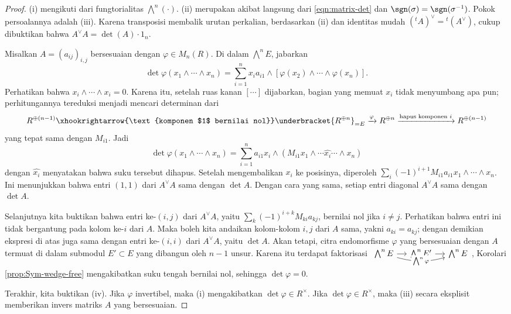 \begin{proof}
	(i) mengikuti dari fungtorialitas $\bigwedge^n(\cdot)$. (ii) merupakan akibat langsung dari \eqref{eqn:matrix-det} dan $\sgn(\sigma) = \sgn(\sigma^{-1})$. Pokok persoalannya adalah (iii). Karena transposisi membalik urutan perkalian, berdasarkan (ii) dan identitas mudah $({}^t A)^\vee = {}^t(A^\vee)$, cukup dibuktikan bahwa $A^\vee A = \det(A) \cdot 1_n$.

	Misalkan $A = (a_{ij})_{i,j}$ bersesuaian dengan $\varphi \in M_n(R)$. Di dalam $\bigwedge^n E$, jabarkan
	\[ \det\varphi(x_1 \wedge \cdots \wedge x_n) = \sum_{i=1}^n x_i a_{i1} \wedge \left[ \varphi(x_2) \wedge \cdots \wedge \varphi(x_n) \right]. \]
	Perhatikan bahwa $x_i \wedge \cdots \wedge x_i = 0$. Karena itu, setelah ruas kanan $[\cdots]$ dijabarkan, bagian yang memuat $x_i$ tidak menyumbang apa pun; perhitungannya tereduksi menjadi mencari determinan dari
	\[ R^{\oplus (n-1)} \xhookrightarrow{\text{komponen $1$ bernilai nol}} \underbracket{R^{\oplus n}}_{= E} \xrightarrow{\varphi} R^{\oplus n} \xrightarrow{\text{hapus komponen $i$}} R^{\oplus (n-1)} \]
	yang tepat sama dengan $M_{i1}$. Jadi
	\[ \det\varphi(x_1 \wedge \cdots \wedge x_n) = \sum_{i=1}^n a_{i1} x_i \wedge \left( M_{i1}  x_1 \wedge \cdots \widehat{x_i} \cdots \wedge x_n \right) \]
	dengan $\widehat{x_i}$ menyatakan bahwa suku tersebut dihapus. Setelah mengembalikan $x_i$ ke posisinya, diperoleh $\sum_i (-1)^{i+1} M_{i1} a_{i1} x_1 \wedge \cdots \wedge x_n$. Ini menunjukkan bahwa entri $(1,1)$ dari $A^\vee A$ sama dengan $\det A$. Dengan cara yang sama, setiap entri diagonal $A^\vee A$ sama dengan $\det A$.

	Selanjutnya kita buktikan bahwa entri ke-$(i,j)$ dari $A^\vee A$, yaitu $ \sum_k (-1)^{i+k} M_{ki} a_{kj}$, bernilai nol jika $i \neq j$. Perhatikan bahwa entri ini tidak bergantung pada kolom ke-$i$ dari $A$. Maka boleh kita andaikan kolom-kolom $i,j$ dari $A$ sama, yakni $a_{ki}=a_{kj}$; dengan demikian ekspresi di atas juga sama dengan entri ke-$(i,i)$ dari $A^\vee A$, yaitu $\det A$. Akan tetapi, citra endomorfisme $\varphi$ yang bersesuaian dengan $A$ termuat di dalam submodul $E' \subset E$ yang dibangun oleh $n-1$ unsur. Karena itu terdapat faktorisasi
	$\begin{tikzcd}[column sep=small] \bigwedge^n E \arrow[r] \arrow[rr, bend right="15", "\bigwedge^n \varphi" description] & \bigwedge^n E' \arrow[r] & \bigwedge^n E \end{tikzcd}$,
	Korolari \ref{prop:Sym-wedge-free} mengakibatkan suku tengah bernilai nol, sehingga $\det\varphi = 0$.

	Terakhir, kita buktikan (iv). Jika $\varphi$ invertibel, maka (i) mengakibatkan $\det\varphi \in R^\times$. Jika $\det\varphi \in R^\times$, maka (iii) secara eksplisit memberikan invers matriks $A$ yang bersesuaian.
\end{proof}


